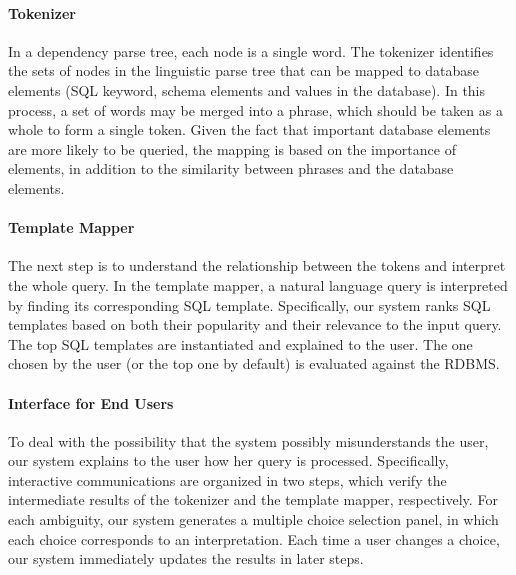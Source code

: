\documentclass{vldb}
\begin{document}
\paragraph*{Tokenizer}
In a dependency parse tree, each node is a single word.  The tokenizer identifies the sets of nodes in the linguistic parse tree that can be mapped to database elements (SQL keyword, schema elements and values in the database).  In this process, a set of words may be merged into a phrase, which should be taken as a whole to form a single token.  Given the fact that important database elements are more likely to be queried, the mapping is based on the importance of elements, in addition to the similarity between phrases and the database elements.  

\paragraph*{Template Mapper}
The next step is to understand the relationship between the tokens and interpret the whole query.  In the template mapper, a natural language query is interpreted by finding its corresponding SQL template.  Specifically, our system ranks SQL templates based on both their popularity and their relevance to the input query.  The top SQL templates are instantiated and explained to the user. The one chosen by the user (or the top one by default) is evaluated against the RDBMS.

\paragraph*{Interface for End Users}
To deal with the possibility that  the system possibly misunderstands the user, our system explains to the user how her query is processed.  Specifically, interactive communications are organized in two steps, which verify the intermediate results of the tokenizer and the template mapper, respectively.  For each ambiguity, our system generates a multiple choice selection panel, in which each choice corresponds to an interpretation.  Each time a user changes a choice, our system immediately updates the results in later steps.   
\end{document}
